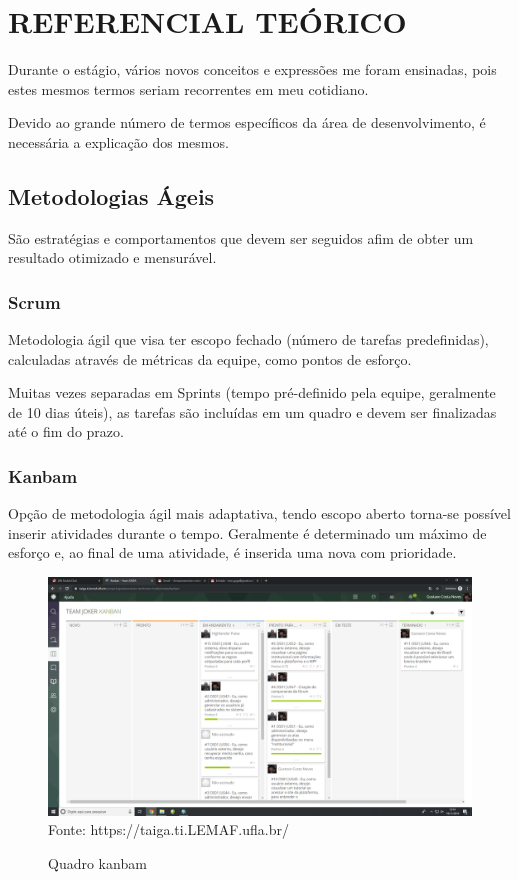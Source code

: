 \chapter{REFERENCIAL TEÓRICO}
\label{cap:elementos}

Durante o estágio, vários novos conceitos e expressões me foram ensinadas, pois estes mesmos termos seriam recorrentes em meu cotidiano.

Devido ao grande número de termos específicos da área de desenvolvimento, é necessária a explicação dos mesmos.

\section{Metodologias Ágeis}

São estratégias e comportamentos que devem ser seguidos afim de obter um resultado otimizado e mensurável.

\subsection{Scrum}

Metodologia ágil que visa ter escopo fechado (número de tarefas predefinidas), calculadas através de métricas da equipe, como pontos de esforço.

Muitas vezes separadas em Sprints (tempo pré-definido pela equipe, geralmente de 10 dias úteis), as tarefas são incluídas em um quadro e devem ser finalizadas até o fim do prazo.

\subsection{Kanbam}
  Opção de metodologia ágil mais adaptativa, tendo escopo aberto torna-se possível inserir atividades durante o tempo.
  Geralmente é determinado um máximo de esforço e, ao final de uma atividade, é inserida uma nova com prioridade.
\begin{figure}[H]
\centering
\caption{Quadro kanbam} %
\includegraphics[scale=0.2]{quadroKanbam}\\  %
{\small Fonte: https://taiga.ti.LEMAF.ufla.br/} %
\label{fig:exemplo} %
\end{figure}

